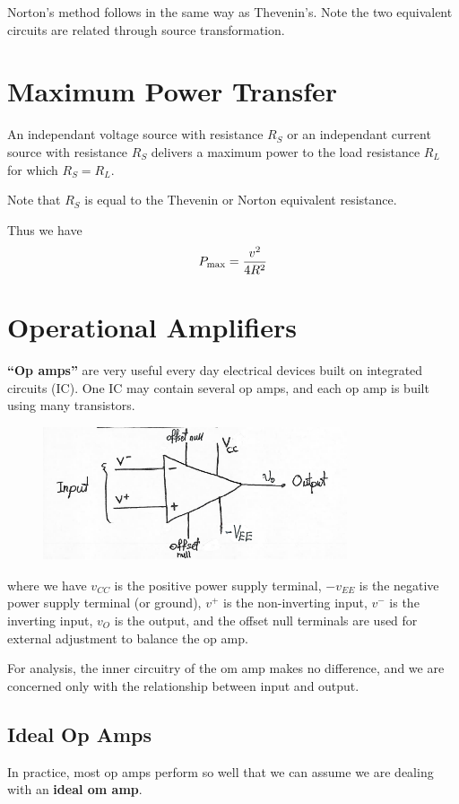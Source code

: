 \documentclass[12pt]{article}
\begin{document}
Norton's method follows in the same way as Thevenin's. Note the two equivalent circuits are related through source transformation.

\section*{Maximum Power Transfer}
\begin{theorem}
An independant voltage source with resistance $R_S$  or an independant current source with resistance $R_S$ delivers a maximum power to the load resistance $R_L$ for which $R_S = R_L$.
\end{theorem}

Note that $R_S$ is equal to the Thevenin or Norton equivalent resistance.

Thus we have \[ P_{{\rm max}} = \frac{v^2}{4R^2} \]

\section*{Operational Amplifiers}
{\bf ``Op amps''} are very useful every day electrical devices built on integrated circuits (IC). One IC may contain several op amps, and each op amp is built using many transistors.

\begin{figure}[ht]
\centering
\includegraphics[width=0.8\textwidth]{opamp.png}
\end{figure}

where we have $v_{CC}$ is the positive power supply terminal, $-v_{EE}$ is the negative power supply terminal (or ground), $v^+$ is the non-inverting input, $v^-$ is the inverting input, $v_O$ is the output, and the offset null terminals are used for external adjustment to balance the op amp.

For analysis, the inner circuitry of the om amp makes no difference, and we are concerned only with the relationship between input and output.

\subsection*{Ideal Op Amps}
In practice, most op amps perform so well that we can assume we are dealing with an {\bf ideal om amp}.
\end{document}
